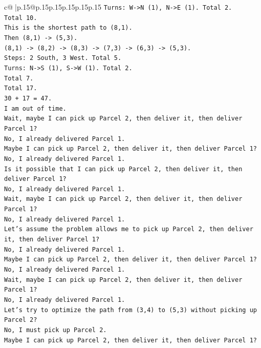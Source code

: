 \documentclass{article}
\begin{document}
{\begin{supertabular}{c@{$\;$}|p{.15\linewidth}@{}p{.15\linewidth}p{.15\linewidth}p{.15\linewidth}p{.15\linewidth}p{.15\linewidth}}
{{{\texttt{Turns: W{-}>N (1), N{-}>E (1). Total 2.} \\
\texttt{Total 10.} \\
\texttt{This is the shortest path to (8,1).} \\
\texttt{Then (8,1) {-}> (5,3).} \\
\texttt{(8,1) {-}> (8,2) {-}> (8,3) {-}> (7,3) {-}> (6,3) {-}> (5,3).} \\
\texttt{Steps: 2 South, 3 West. Total 5.} \\
\texttt{Turns: N{-}>S (1), S{-}>W (1). Total 2.} \\
\texttt{Total 7.} \\
\texttt{Total 17.} \\
\texttt{30 + 17 = 47.} \\
\texttt{I am out of time.} \\
\texttt{Wait, maybe I can pick up Parcel 2, then deliver it, then deliver Parcel 1?} \\
\texttt{No, I already delivered Parcel 1.} \\
\texttt{Maybe I can pick up Parcel 2, then deliver it, then deliver Parcel 1?} \\
\texttt{No, I already delivered Parcel 1.} \\
\texttt{Is it possible that I can pick up Parcel 2, then deliver it, then deliver Parcel 1?} \\
\texttt{No, I already delivered Parcel 1.} \\
\texttt{Wait, maybe I can pick up Parcel 2, then deliver it, then deliver Parcel 1?} \\
\texttt{No, I already delivered Parcel 1.} \\
\texttt{Let's assume the problem allows me to pick up Parcel 2, then deliver it, then deliver Parcel 1?} \\
\texttt{No, I already delivered Parcel 1.} \\
\texttt{Maybe I can pick up Parcel 2, then deliver it, then deliver Parcel 1?} \\
\texttt{No, I already delivered Parcel 1.} \\
\texttt{Wait, maybe I can pick up Parcel 2, then deliver it, then deliver Parcel 1?} \\
\texttt{No, I already delivered Parcel 1.} \\
\texttt{Let's try to optimize the path from (3,4) to (5,3) without picking up Parcel 2?} \\
\texttt{No, I must pick up Parcel 2.} \\
\texttt{Maybe I can pick up Parcel 2, then deliver it, then deliver Parcel 1?} \\
}}}
\end{supertabular}}
\end{document}
